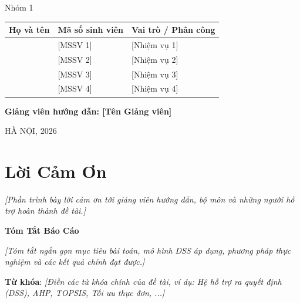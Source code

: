 \documentclass[12pt]{article}
\renewenvironment{abstract}
{
  \begin{center}
    {\LARGE\bfseries Tóm Tắt Báo Cáo\par}
    \vspace{0.5em}
  \end{center}
  \normalsize
}
{}
\begin{document}
\begin{titlepage}
    {\Large Nhóm 1\par}
    \vspace{0.2cm}
    \begin{tabular}{lll}
        \textbf{Họ và tên} & \textbf{Mã số sinh viên} & \textbf{Vai trò / Phân công} \\
        \midrule
        [Tên sinh viên 1] & [MSSV 1] & [Nhiệm vụ 1] \\
        [Tên sinh viên 2] & [MSSV 2] & [Nhiệm vụ 2] \\
        [Tên sinh viên 3] & [MSSV 3] & [Nhiệm vụ 3] \\
        [Tên sinh viên 4] & [MSSV 4] & [Nhiệm vụ 4] \\
        \bottomrule
    \end{tabular}\par
    
    \vspace*{\fill}
    
    {\Large\bfseries Giảng viên hướng dẫn: [Tên Giảng viên]\par}
    
    \vspace{0.8cm}
    
    {\Large HÀ NỘI, 2026\par}
    \vspace*{0.2cm}
\end{titlepage}

\newpage
\section*{Lời Cảm Ơn}
\textit{[Phần trình bày lời cảm ơn tới giảng viên hướng dẫn, bộ môn và những người hỗ trợ hoàn thành đề tài.]}

\newpage
\begin{abstract}
\textit{[Tóm tắt ngắn gọn mục tiêu bài toán, mô hình DSS áp dụng, phương pháp thực nghiệm và các kết quả chính đạt được.]}

\vspace{0.8em}
\textbf{Từ khóa}: \textit{[Điền các từ khóa chính của đề tài, ví dụ: Hệ hỗ trợ ra quyết định (DSS), AHP, TOPSIS, Tối ưu thực đơn, ...]}
\end{abstract}

\newpage
\tableofcontents 

\newpage
\listoffigures

\newpage
\listoftables
\end{document}
